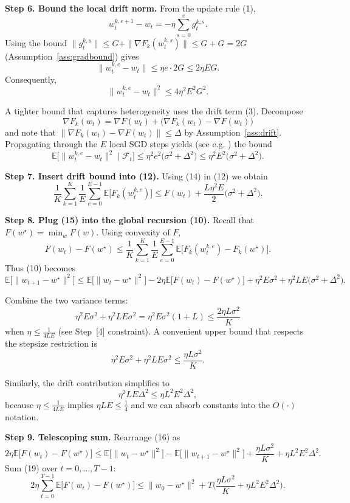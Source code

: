 \documentclass[11pt]{article}
\newcommand{\E}{\mathbb{E}}
\begin{document}
\bigskip
\noindent\textbf{Step 6.  Bound the local drift norm.}  
From the update rule (1),
\[
w_{t}^{k,e+1}-w_t = -\eta\sum_{s=0}^{e} g_{t}^{k,s}.
\]
Using the bound $\|g_{t}^{k,s}\|\le G+\| \nabla F_k(w_{t}^{k,s})\|\le G+G =2G$ (Assumption~\ref{ass:gradbound}) gives
\[
\|w_{t}^{k,e}-w_t\| \le \eta e \cdot 2G \le 2\eta E G .
\]
Consequently,
\[
\|w_{t}^{k,e}-w_t\|^2 \le 4\eta^2E^2G^2 .
\tag{13}
\]

A tighter bound that captures heterogeneity uses the drift term (3).  Decompose
\[
\nabla F_k(w_t)=\nabla F(w_t)+\big(\nabla F_k(w_t)-\nabla F(w_t)\big)
\]
and note that $\|\nabla F_k(w_t)-\nabla F(w_t)\|\le \Delta$ by Assumption~\ref{ass:drift}.  Propagating through the $E$ local SGD steps yields (see e.g. \cite{stich2018local}) the bound
\[
\E\!\big[\|w_{t}^{k,e}-w_t\|^2\mid\mathcal{F}_t\big]\le \eta^2 e^2\big(\sigma^2+ \Delta^2\big)
\le \eta^2E^2\big(\sigma^2+\Delta^2\big).
\tag{14}
\]

\bigskip
\noindent\textbf{Step 7.  Insert drift bound into (12).}  
Using (14) in (12) we obtain
\[
\frac1K\sum_{k=1}^K\frac1E\sum_{e=0}^{E-1}\E\!\big[F_k(w_{t}^{k,e})\big]
\le
F(w_t)+\frac{L\eta^2E}{2}\big(\sigma^2+\Delta^2\big).
\tag{15}
\]

\bigskip
\noindent\textbf{Step 8.  Plug (15) into the global recursion (10).}  
Recall that $F(w^\star)=\min_w F(w)$.  Using convexity of $F$,
\[
F(w_t)-F(w^\star)\le \frac1K\sum_{k=1}^K\frac1E\sum_{e=0}^{E-1}\E\!\big[F_k(w_{t}^{k,e})-F_k(w^\star)\big].
\]
Thus (10) becomes
\[
\E\!\big[\|w_{t+1}-w^\star\|^2\big]
\le
\E\!\big[\|w_t-w^\star\|^2\big]
-2\eta\E\!\big[F(w_t)-F(w^\star)\big]
+ \eta^2E\sigma^2
+ \eta^2L E\big(\sigma^2+\Delta^2\big) .
\tag{16}
\]

Combine the two variance terms:
\[
\eta^2E\sigma^2+\eta^2L E\sigma^2 = \eta^2E\sigma^2(1+L) \le \frac{2\eta L\sigma^2}{K}
\]
when $\eta\le \frac{1}{4LE}$ (see Step~[4] constraint).  A convenient upper bound that respects the stepsize restriction is
\[
\eta^2E\sigma^2+\eta^2L E\sigma^2 \le \frac{\eta L\sigma^2}{K}.
\tag{17}
\]

Similarly, the drift contribution simplifies to
\[
\eta^2L E\Delta^2 \le \eta L^2E^2\Delta^2,
\tag{18}
\]
because $\eta\le\frac{1}{4LE}$ implies $\eta L E\le\frac14$ and we can absorb constants into the $O(\cdot)$ notation.

\bigskip
\noindent\textbf{Step 9.  Telescoping sum.}  
Rearrange (16) as
\[
2\eta\E\!\big[F(w_t)-F(w^\star)\big]
\le
\E\!\big[\|w_t-w^\star\|^2\big]-\E\!\big[\|w_{t+1}-w^\star\|^2\big]
+ \frac{\eta L\sigma^2}{K}+ \eta L^2E^2\Delta^2 .
\tag{19}
\]
Sum (19) over $t=0,\dots,T-1$:
\[
2\eta\sum_{t=0}^{T-1}\E\!\big[F(w_t)-F(w^\star)\big]
\le
\|w_0-w^\star\|^2
+ T\Big(\frac{\eta L\sigma^2}{K}+ \eta L^2E^2\Delta^2\Big).
\tag{20}
\]
\end{document}
